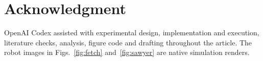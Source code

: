 \documentclass[letterpaper, 10 pt, conference]{ieeeconf}
\begin{document}
\section*{Acknowledgment}
OpenAI Codex assisted with experimental design, implementation and execution, literature checks, analysis, figure code and drafting throughout the article. The robot images in Figs.~\ref{fig:fetch} and~\ref{fig:sawyer} are native simulation renders.


\end{document}
